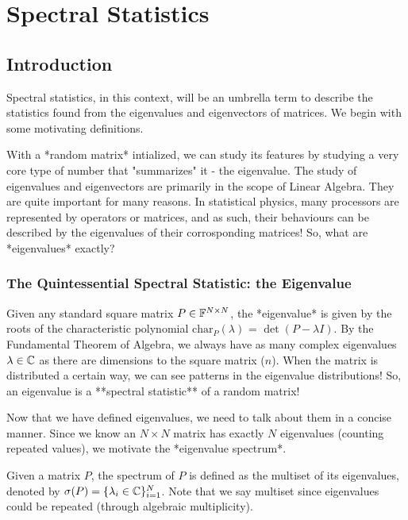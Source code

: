 \chapter{Spectral Statistics}
\section{Introduction}
Spectral statistics, in this context, will be an umbrella term to describe the statistics found from the eigenvalues and eigenvectors of matrices. We begin with some motivating definitions.

With a *random matrix* intialized, we can study its features by studying a very core type of number that "summarizes" it - the eigenvalue. The study of eigenvalues and eigenvectors are primarily in the scope of Linear Algebra. They are quite important for many reasons. In statistical physics, many processors are represented by operators or matrices, and as such, their behaviours can be described by the eigenvalues of their corrosponding matrices! So, what are *eigenvalues* exactly?

\subsection{The Quintessential Spectral Statistic: the Eigenvalue}

Given any standard square matrix $P \in \mathbb{F}^{N \times N}$, the *eigenvalue* is given by the roots of the characteristic polynomial $\text{char}_P{(\lambda)}$ = $\det(P - \lambda I)$. By the Fundamental Theorem of Algebra, we always have as many complex eigenvalues $\lambda \in \mathbb{C}$ as there are dimensions to the square matrix ($n$). When the matrix is distributed a certain way, we can see patterns in the eigenvalue distributions! So, an eigenvalue is a **spectral statistic** of a random matrix!

Now that we have defined eigenvalues, we need to talk about them in a concise manner. Since we know an $N \times N$ matrix has exactly $N$ eigenvalues (counting repeated values), we motivate the *eigenvalue spectrum*.

\begin{definition}[Spectrum]
Given a matrix $P$, the spectrum of $P$ is defined as the multiset of its eigenvalues, denoted by $\sigma(P) = \{\lambda_i  \in \mathbb{C}\}_{i=1}^N$. Note that we say multiset since eigenvalues could be repeated (through algebraic multiplicity). 
\end{definition}

